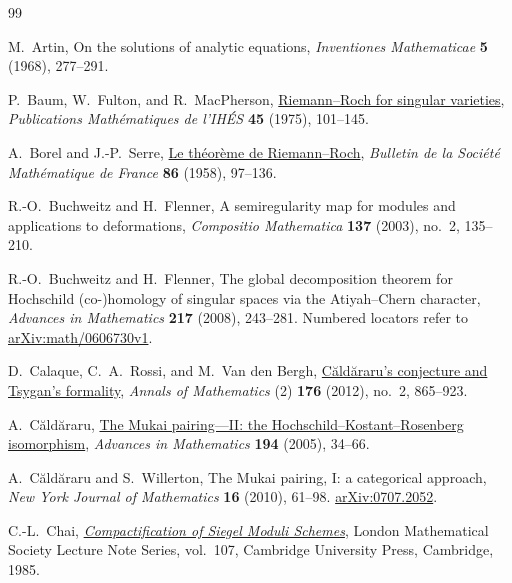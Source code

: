 \documentclass[11pt]{article}
\numberwithin{equation}{section}
\begin{document}
\begin{thebibliography}{99}
\setlength{\itemsep}{3pt plus 1pt minus 1pt}

M.~Artin,
On the solutions of analytic equations,
\emph{Inventiones Mathematicae} \textbf{5} (1968), 277--291.

P.~Baum, W.~Fulton, and R.~MacPherson,
\href{https://www.numdam.org/article/PMIHES_1975__45__101_0.pdf}
{Riemann--Roch for singular varieties},
\emph{Publications Math\'ematiques de l'IH\'ES} \textbf{45} (1975), 101--145.

A.~Borel and J.-P.~Serre,
\href{https://doi.org/10.24033/bsmf.1500}{Le th\'eor\`eme de Riemann--Roch},
\emph{Bulletin de la Soci\'et\'e Math\'ematique de France}
\textbf{86} (1958), 97--136.

R.-O.~Buchweitz and H.~Flenner,
A semiregularity map for modules and applications to deformations,
\emph{Compositio Mathematica} \textbf{137} (2003), no.~2, 135--210.

R.-O.~Buchweitz and H.~Flenner,
The global decomposition theorem for Hochschild \mbox{(co-)homology}
of singular spaces via the Atiyah--Chern character,
\emph{Advances in Mathematics} \textbf{217} (2008), 243--281.
Numbered locators refer to
\href{https://arxiv.org/abs/math/0606730v1}{arXiv:math/0606730v1}.

D.~Calaque, C.~A.~Rossi, and M.~Van den Bergh,
\href{https://doi.org/10.4007/annals.2012.176.2.4}
{C\u{a}ld\u{a}raru's conjecture and Tsygan's formality},
\emph{Annals of Mathematics} (2) \textbf{176} (2012), no.~2, 865--923.

A.~C\u{a}ld\u{a}raru,
\href{https://doi.org/10.1016/j.aim.2004.05.012}
{The Mukai pairing---II: the Hochschild--Kostant--Rosenberg isomorphism},
\emph{Advances in Mathematics} \textbf{194} (2005), 34--66.

A.~C\u{a}ld\u{a}raru and S.~Willerton,
The Mukai pairing, I: a categorical approach,
\emph{New York Journal of Mathematics} \textbf{16} (2010), 61--98.
\href{https://arxiv.org/abs/0707.2052}{arXiv:0707.2052}.

C.-L.~Chai,
\href{https://www.cambridge.org/core/books/compactification-of-siegel-moduli-schemes/3372406AEC90801C3DC5EB20D33C3795}
{\emph{Compactification of Siegel Moduli Schemes}},
London Mathematical Society Lecture Note Series, vol.~107,
Cambridge University Press, Cambridge, 1985.


\end{thebibliography}
\end{document}
